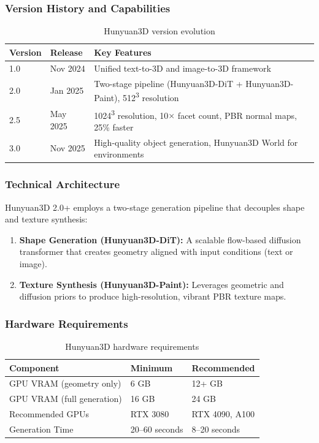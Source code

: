 \documentclass[11pt]{article}
\begin{document}
\subsubsection{Version History and Capabilities}

\begin{table}[H]
\centering
\small
\begin{tabularx}{\textwidth}{@{}l l X@{}}
\toprule
\textbf{Version} & \textbf{Release} & \textbf{Key Features} \\
\midrule
1.0 & Nov 2024 & Unified text-to-3D and image-to-3D framework \\
2.0 & Jan 2025 & Two-stage pipeline (Hunyuan3D-DiT + Hunyuan3D-Paint), 512\textsuperscript{3} resolution \\
2.5 & May 2025 & 1024\textsuperscript{3} resolution, 10$\times$ facet count, PBR normal maps, 25\% faster \\
3.0 & Nov 2025 & High-quality object generation, Hunyuan3D World for environments \\
\bottomrule
\end{tabularx}
\caption{Hunyuan3D version evolution}
\label{tab:hunyuan-versions}
\end{table}

\subsubsection{Technical Architecture}

Hunyuan3D 2.0+ employs a two-stage generation pipeline that decouples shape and texture synthesis:

\begin{enumerate}[leftmargin=2em]
  \item \textbf{Shape Generation (Hunyuan3D-DiT):} A scalable flow-based diffusion transformer that creates geometry aligned with input conditions (text or image).
  \item \textbf{Texture Synthesis (Hunyuan3D-Paint):} Leverages geometric and diffusion priors to produce high-resolution, vibrant PBR texture maps.
\end{enumerate}

\subsubsection{Hardware Requirements}

\begin{table}[H]
\centering
\small
\begin{tabular}{@{}l l l@{}}
\toprule
\textbf{Component} & \textbf{Minimum} & \textbf{Recommended} \\
\midrule
GPU VRAM (geometry only) & 6 GB & 12+ GB \\
GPU VRAM (full generation) & 16 GB & 24 GB \\
Recommended GPUs & RTX 3080 & RTX 4090, A100 \\
Generation Time & 20--60 seconds & 8--20 seconds \\
\bottomrule
\end{tabular}
\caption{Hunyuan3D hardware requirements}
\label{tab:hunyuan-hardware}
\end{table}
\end{document}
